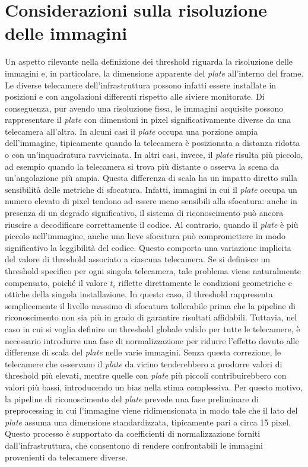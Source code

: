 \documentclass[
    target=bach,
    aauheader=,
    style=
]{thud}
\begin{document}
\section{Considerazioni sulla risoluzione delle immagini}

Un aspetto rilevante nella definizione dei threshold riguarda la risoluzione delle immagini e, in particolare, la dimensione apparente del \textit{plate} all'interno del frame. Le diverse telecamere dell'infrastruttura possono infatti essere installate in posizioni e con angolazioni differenti rispetto alle siviere monitorate. Di conseguenza, pur avendo una risoluzione fissa, le immagini acquisite possono rappresentare il \textit{plate} con dimensioni in pixel significativamente diverse da una telecamera all'altra. In alcuni casi il \textit{plate} occupa una porzione ampia dell'immagine, tipicamente quando la telecamera è posizionata a distanza ridotta o con un'inquadratura ravvicinata. In altri casi, invece, il \textit{plate} risulta più piccolo, ad esempio quando la telecamera si trova più distante o osserva la scena da un'angolazione più ampia. Questa differenza di scala ha un impatto diretto sulla sensibilità delle metriche di sfocatura. Infatti, immagini in cui il \textit{plate} occupa un numero elevato di pixel tendono ad essere meno sensibili alla sfocatura: anche in presenza di un degrado significativo, il sistema di riconoscimento può ancora riuscire a decodificare correttamente il codice. Al contrario, quando il \textit{plate} è più piccolo nell'immagine, anche una lieve sfocatura può compromettere in modo significativo la leggibilità del codice. Questo comporta una variazione implicita del valore di threshold associato a ciascuna telecamera. Se si definisce un threshold specifico per ogni singola telecamera, tale problema viene naturalmente compensato, poiché il valore $t_i$ riflette direttamente le condizioni geometriche e ottiche della singola installazione. In questo caso, il threshold rappresenta semplicemente il livello massimo di sfocatura tollerabile prima che la pipeline di riconoscimento non sia più in grado di garantire risultati affidabili. Tuttavia, nel caso in cui si voglia definire un threshold globale valido per tutte le telecamere, è necessario introdurre una fase di normalizzazione per ridurre l'effetto dovuto alle differenze di scala del \textit{plate} nelle varie immagini. Senza questa correzione, le telecamere che osservano il \textit{plate} da vicino tenderebbero a produrre valori di threshold più elevati, mentre quelle con \textit{plate} più piccoli contribuirebbero con valori più bassi, introducendo un bias nella stima complessiva. Per questo motivo, la pipeline di riconoscimento del \textit{plate} prevede una fase preliminare di preprocessing in cui l'immagine viene ridimensionata in modo tale che il lato del \textit{plate} assuma una dimensione standardizzata, tipicamente pari a circa 15 pixel. Questo processo è supportato da coefficienti di normalizzazione forniti dall'infrastruttura, che consentono di rendere confrontabili le immagini provenienti da telecamere diverse.
\end{document}
